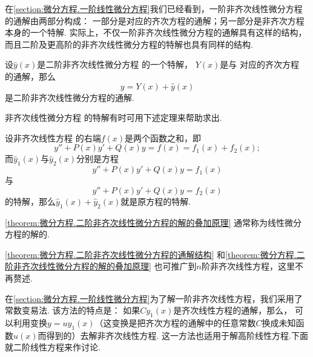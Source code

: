 在\cref{section:微分方程.一阶线性微分方程}我们已经看到，一阶非齐次线性微分方程的通解由两部分构成：
一部分是对应的齐次方程的通解；另一部分是非齐次方程本身的一个特解.
实际上，不仅一阶非齐次线性微分方程的通解具有这样的结构，而且二阶及更高阶的非齐次线性微分方程的特解也具有同样的结构.
\begin{theorem}\label{theorem:微分方程.二阶非齐次线性微分方程的通解结构}
设\(\hat{y}(x)\)是二阶非齐次线性微分方程  的一个特解，%
\(Y(x)\)是与  对应的齐次方程  的通解，那么\begin{equation}\label{equation:微分方程.二阶非齐次线性微分方程的通解结构}
y=Y(x)+\hat{y}(x)
\end{equation}是二阶非齐次线性微分方程的通解.
\end{theorem}

非齐次线性微分方程  的特解有时可用下述定理来帮助求出.
\begin{theorem}\label{theorem:微分方程.二阶非齐次线性微分方程的解的叠加原理}
设非齐次线性方程  的右端\(f(x)\)是两个函数之和，即\[
y''+P(x)y'+Q(x)y
=f(x)
=f_1(x)+f_2(x);
\]而\(\hat{y}_1(x)\)与\(\hat{y}_2(x)\)分别是方程\[
y''+P(x)y'+Q(x)y=f_1(x)
\]与\[
y''+P(x)y'+Q(x)y=f_2(x)
\]的特解，那么\(\hat{y}_1(x)+\hat{y}_2(x)\)就是原方程的特解.
\end{theorem}

\cref{theorem:微分方程.二阶非齐次线性微分方程的解的叠加原理} 通常称为线性微分方程的解的.

\cref{theorem:微分方程.二阶非齐次线性微分方程的通解结构} 和\cref{theorem:微分方程.二阶非齐次线性微分方程的解的叠加原理} 也可推广到\(n\)阶非齐次线性方程，这里不再赘述.

在\cref{section:微分方程.一阶线性微分方程}为了解一阶非齐次线性方程，我们采用了常数变易法.
该方法的特点是：
如果\(C y_1(x)\)是齐次线性方程的通解，那么，%
可以利用变换\(y = u y_1(x)\)（这变换是把齐次方程的通解中的任意常数\(C\)换成未知函数\(u(x)\)而得到的）去解非齐次线性方程.
这一方法也适用于解高阶线性方程.下面就二阶线性方程来作讨论.

